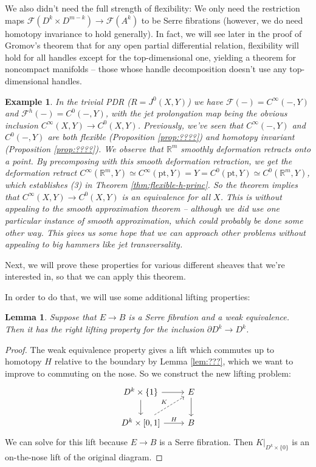 \documentclass{article}
\newtheorem{lemma}[theorem]{Lemma}
\newtheorem{example}[theorem]{Example}
\newtheorem{proposed work}[theorem]{Proposed Work}
\begin{document}
We also didn't need the full strength of flexibility: We only need the restriction maps $\mathcal F(D^k \times D^{m-k}) \to \mathcal F(A^k)$ to be Serre fibrations (however, we do need homotopy invariance to hold generally). In fact, we will see later in the proof of Gromov's theorem that for any open partial differential relation, flexibility will hold for all handles except for the top-dimensional one, yielding a theorem for noncompact manifolds -- those whose handle decomposition doesn't use any top-dimensional handles.

\begin{example}
In the trivial PDR ($R = J^0(X,Y)$) we have $\mathcal F(-) = C^\infty(-,Y)$ and $\mathcal F^h(-) = C^0(-,Y)$, with the jet prolongation map being the obvious inclusion $C^\infty(X,Y) \to C^0(X,Y)$. Previously, we've seen that $C^\infty(-,Y)$ and $C^0(-,Y)$ are both flexible (Proposition \ref{prop:????}) and homotopy invariant (Proposition \ref{prop:????}). We observe that $\mathbb R^m$ smoothly deformation retracts onto a point. By precomposing with this smooth deformation retraction, we get the deformation retract $C^\infty(\mathbb R^m, Y) \simeq C^\infty(\mathrm{pt},Y) = Y = C^0(\mathrm{pt},Y) \simeq C^0(\mathbb R^m,Y)$, which establishes (3) in Theorem \ref{thm:flexible-h-princ}. So the theorem implies that $C^\infty(X,Y) \to C^0(X,Y)$ is an equivalence for all $X$. This is without appealing to the smooth approximation theorem -- although we did use one particular instance of smooth approximation, which could probably be done some other way. This gives us some hope that we can approach other problems without appealing to big hammers like jet transversality.
\end{example}

Next, we will prove these properties for various different sheaves that we're interested in, so that we can apply this theorem.

In order to do that, we will use some additional lifting properties:

\begin{lemma}
Suppose that $E \to B$ is a Serre fibration and a weak equivalence. Then it has the right lifting property for the inclusion $\partial D^k \to D^k$.
\end{lemma}
\begin{proof}
The weak equivalence property gives a lift which commutes up to homotopy $H$ relative to the boundary by Lemma \ref{lem:???}, which we want to improve to commuting on the nose. So we construct the new lifting problem:
\[
\begin{tikzcd}
D^k \times \{1\} \ar[r] \ar[d] & E \ar[d] \\
D^k \times [0,1] \ar[r,"H"] \ar[ur,dashed,"K"] & B
\end{tikzcd}
\]
We can solve for this lift because $E \to B$ is a Serre fibration. Then $K|_{D^k \times \{0\}}$ is an on-the-nose lift of the original diagram.
\end{proof}
\end{document}
